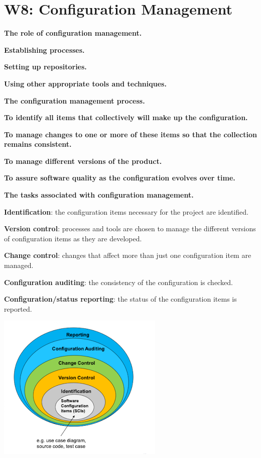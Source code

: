 \section{W8: Configuration Management}

\textbf{The role of configuration management.}

    \textbf{Establishing processes.}

    \textbf{Setting up repositories.}

    \textbf{Using other appropriate tools and techniques.}

\textbf{The configuration management process.}

    \textbf{To identify all items that collectively will make up the configuration.}

    \textbf{To manage changes to one or more of these items so that the collection remains consistent.}

    \textbf{To manage different versions of the product.}

    \textbf{To assure software quality as the configuration evolves over time.}

\textbf{The tasks associated with configuration management.}

    \textbf{Identification}: the configuration items necessary for the project are identified.

    \textbf{Version control}: processes and tools are chosen to manage the different versions of configuration items as they are developed.

    \textbf{Change control}: changes that affect more than just one configuration item are managed.

    \textbf{Configuration auditing}: the consistency of the configuration is checked.

    \textbf{Configuration/status reporting}: the status of the configuration items is reported.

    \includegraphics[width=\linewidth]{figs/SCR-20240606-pkfg.png}
